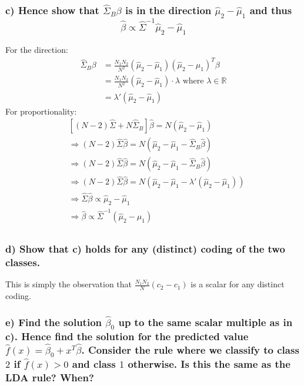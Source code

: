 \subsubsection*{c) Hence show that $\hat{\Sigma}_B \beta$ is in the direction  $\hat{\mu}_2 - \hat{\mu}_1$ and thus
$$ \hat{\beta} \propto \hat{\Sigma}^{-1} \hat{\mu}_2 - \hat{\mu}_1 $$
}
For the direction:
\begin{align*}
    \hat{\Sigma}_B \beta &=  \frac{N_1 N_2}{N^2}  (\hat{\mu}_2 - \hat{\mu}_1) (\hat{\mu}_2 - \hat{\mu}_1)^T \beta \\
    &=  \frac{N_1 N_2}{N^2}  (\hat{\mu}_2 - \hat{\mu}_1) \cdot \lambda \text{ where } \lambda \in \mathbb{R} \\
    &=  \lambda' (\hat{\mu}_2 - \hat{\mu}_1) 
\end{align*}
For proportionality:
\begin{align*}
    &\left[ (N-2) \hat{\Sigma} + N \hat{\Sigma}_B \right] \hat{\beta} = N (\hat{\mu}_2 - \hat{\mu}_1) \\ 
    &\Rightarrow (N-2) \hat{\Sigma} \hat{\beta} = N (\hat{\mu}_2 - \hat{\mu}_1 - \hat{\Sigma}_B \hat{\beta} ) \\ 
    &\Rightarrow (N-2) \hat{\Sigma} \hat{\beta} = N (\hat{\mu}_2 - \hat{\mu}_1 - \hat{\Sigma}_B \hat{\beta} ) \\ 
    &\Rightarrow (N-2) \hat{\Sigma} \hat{\beta} = N (\hat{\mu}_2 - \hat{\mu}_1 -  \lambda' (\hat{\mu}_2 - \hat{\mu}_1) ) \\ 
    &\Rightarrow \hat{\Sigma} \hat{\beta} \propto \hat{\mu}_2 - \hat{\mu}_1 \\ 
    &\Rightarrow  \hat{\beta} \propto \hat{\Sigma}^{-1} \left(\hat{\mu}_2 - \hat{\mu}_1\right) \\ 
\end{align*}

\subsubsection*{d) Show that c) holds for any (distinct) coding of the two classes.}

This is simply the observation that $\frac{N_1 N_2}{N}(c_2 - c_1)$ is a scalar for any distinct coding.

\subsubsection*{ e) Find the solution $\hat{\beta}_0$ up to the same scalar multiple as in c). Hence find the solution for the predicted value $\hat{f}(x) = \hat{\beta}_0 + x^T \hat{\beta}$.
Consider the rule where we classify to class $2$ if $\hat{f}(x) > 0$ and class $1$ otherwise. Is this the same as the LDA rule? When?
}

